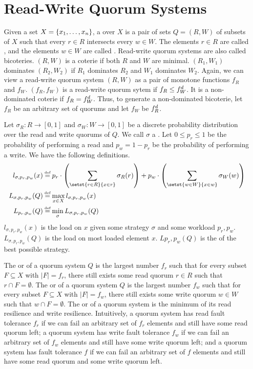 \section{Read-Write Quorum Systems}
Given a set $X = \{x_1, \ldots, x_n\}$, a 
over $X$ is a pair of sets $Q = (R, W)$ of subsets of $X$ such that every $r
\in R$ intersects every $w \in W$. The elements $r \in R$ are called
, and the elements $w \in W$ are called . Read-write quorum systems are also called bicoteries.
%
$(R, W)$ is a coterie if both $R$ and $W$ are minimal. $(R_1, W_1)$ dominates
$(R_2, W_2)$ if $R_1$ dominates $R_2$ and $W_1$ dominates $W_2$. Again, we can
view a read-write quorum system $(R, W)$ as a pair of monotone functions $f_R$
and $f_W$. $(f_R, f_W)$ is a read-write quorum sytem if $f_R \leq f_W^d$.
It is a non-dominated coterie if $f_R = f_W^d$. Thus, to generate a
non-dominated bicoterie, let $f_R$ be an arbitrary set of quorums and let $f_W$
be $f_R^d$.

Let $\sigma_R: R \to [0, 1]$ and $\sigma_W: W \to [0, 1]$ be a discrete
probability distribution over the read and write quorums of $Q$. We call
$\sigma$ a . Let $0 \leq p_r \leq 1$ be the probability of
performing a read and $p_w = 1 - p_r$ be the probability of performing a write.
We have the following definitions.
\begin{align*}
  l_{\sigma,p_r,p_w}(x)
    &\defeq p_r \cdot \parens*{\sum_{\setst{r \in R}{x \in r}} \sigma_R(r)} +
            p_w \cdot \parens*{\sum_{\setst{w \in W}{x \in w}} \sigma_W(w)} \\
  L_{\sigma,p_r,p_w}(Q) &\defeq \max_{x \in X} l_{\sigma,p_r,p_w}(x) \\
  L_{p_r,p_w}(Q)        &\defeq \min_\sigma L_{\sigma,p_r,p_w}(Q)
\end{align*}
$l_{\sigma,p_r,p_w}(x)$ is the load on $x$ given some strategy $\sigma$ and
some workload $p_r,p_w$. $L_{\sigma,p_r,p_w}(Q)$ is the load on most loaded
element $x$. $L{p_r,p_w}(Q)$ is the  of the best possible
strategy.

The  or  of a quorum
system $Q$ is the largest number $f_r$ such that for every subset $F \subseteq
X$ with $|F| = f_r$, there still exists some read quorum $r \in R$ such that $r
\cap F = \emptyset$.
%
The  or  of a quorum
system $Q$ is the largest number $f_w$ such that for every subset $F \subseteq
X$ with $|F| = f_w$, there still exists some write quorum $w \in W$ such that $w
\cap F = \emptyset$.
%
The  or  of a quorum system is the
minimum of its read resilience and write resilience. Intuitively, a quorum
system has read fault tolerance $f_r$ if we can fail an arbitrary set of $f_r$
elements and still have some read quorum left; a quorum system has write fault
tolerance $f_w$ if we can fail an arbitrary set of $f_w$ elements and still
have some write quorum left; and a quorum system has fault tolerance $f$ if we
can fail an arbitrary set of $f$ elements and still have some read quorum and
some write quorum left.
